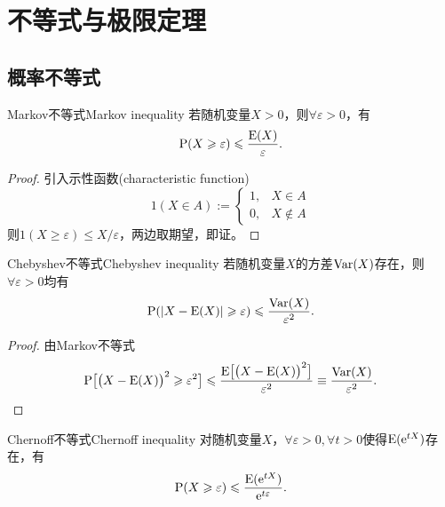 \chapter{不等式与极限定理}

\section{概率不等式}

\begin{theorem}{Markov不等式}{Markov inequality}
	若随机变量$X>0$，则$\forall\varepsilon>0$，有
	\begin{equation}
		\label{eq:Markov ineq}
		\operatorname{P}(X\geqslant\varepsilon)\leqslant\frac{\operatorname{E}(X)}\varepsilon.
	\end{equation}
\end{theorem}

\begin{proof}
	引入示性函数(characteristic function)
	\begin{equation}
		1(X\in A):=\begin{cases}
			1,&X\in A\\
			0,&X\notin A
		\end{cases}
	\end{equation}
	则$1(X\geqslant\varepsilon)\leqslant X/\varepsilon$，两边取期望，即证。
\end{proof}

\begin{theorem}{Chebyshev不等式}{Chebyshev inequality}
	若随机变量$X$的方差$\operatorname{Var}(X)$存在，则$\forall\varepsilon>0$均有
	\begin{equation}
		\operatorname{P}(|X-\operatorname{E}(X)|\geqslant\varepsilon)\leqslant\frac{\operatorname{Var}(X)}{\varepsilon^2}.
	\end{equation}
\end{theorem}

\begin{proof}
	由Markov不等式
	\[
		\operatorname{P}\bigl[\bigl(X-\operatorname{E}(X)\bigr)^2\geqslant\varepsilon^2\bigr]\leqslant\frac{\operatorname{E}\bigl[\bigl(X-\operatorname{E}(X)\bigr)^2\bigr]}{\varepsilon^2}\equiv\frac{\operatorname{Var}(X)}{\varepsilon^2}.
		\qedhere
	\]
\end{proof}

\begin{theorem}{Chernoff不等式}{Chernoff inequality}
	对随机变量$X$，$\forall\varepsilon>0,\forall t>0$使得$\operatorname{E}(\mathop{}\!\mathrm{e}^{tX})$存在，有
	\begin{equation}
		\operatorname{P}(X\geqslant\varepsilon)\leqslant\frac{\operatorname{E}(\mathop{}\!\mathrm{e}^{tX})}{\mathop{}\!\mathrm{e}^{t\varepsilon}}.
	\end{equation}
\end{theorem}

